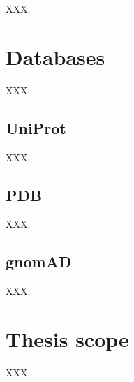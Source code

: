 XXX.

\section{Databases}

XXX.

\subsection{UniProt}

XXX.

\subsection{PDB}

XXX.

\subsection{gnomAD}

XXX.

\section{Thesis scope}

XXX.


